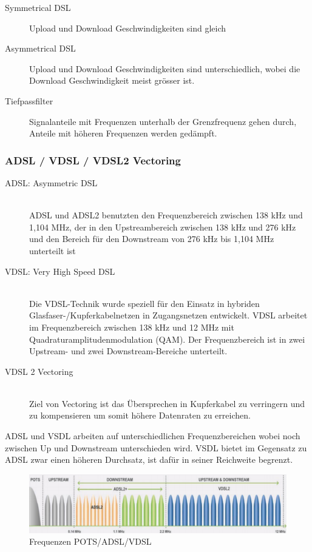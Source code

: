 \begin{description}
	\item[Symmetrical DSL] Upload und Download Geschwindigkeiten sind gleich
	\item[Asymmetrical DSL] Upload und Download Geschwindigkeiten sind unterschiedlich, wobei die Download Geschwindigkeit meist grösser ist.
	\item[Tiefpassfilter] Signalanteile mit Frequenzen unterhalb der Grenzfrequenz gehen durch, Anteile mit höheren Frequenzen werden gedämpft.
\end{description}

\subsubsection{ADSL / VDSL / VDSL2 Vectoring}
\begin{description}
	\item[ADSL: Asymmetric DSL] \hfill \\
	ADSL und ADSL2 benutzten den Frequenzbereich zwischen 138 kHz und 1,104 MHz, der in den Upstreambereich zwischen 138 kHz und 276 kHz und den Bereich für den Downstream von 276 kHz bis 1,104 MHz unterteilt ist
	\item[VDSL: Very High Speed DSL] \hfill \\
	Die VDSL-Technik wurde speziell für den Einsatz in hybriden Glasfaser-/Kupferkabelnetzen in Zugangsnetzen entwickelt. VDSL arbeitet im Frequenzbereich zwischen 138 kHz und 12 MHz mit Quadraturamplitudenmodulation (QAM). Der Frequenzbereich ist in zwei Upstream- und zwei Downstream-Bereiche unterteilt. 
	\item[VDSL 2 Vectoring] \hfill \\
	Ziel von Vectoring ist das Übersprechen in Kupferkabel zu verringern und zu kompensieren um somit höhere Datenraten zu erreichen.
\end{description}

ADSL und VSDL arbeiten auf unterschiedlichen Frequenzbereichen wobei noch zwischen Up und Downstream unterschieden wird. VSDL bietet im Gegensatz zu ADSL zwar einen höheren Durchsatz, ist dafür in seiner Reichweite begrenzt.

\begin{figure}[h]
	\centering
	\includegraphics[width=0.7\linewidth]{images/pots_adsl_vdsl}
	\caption{Frequenzen POTS/ADSL/VDSL}
\end{figure}

